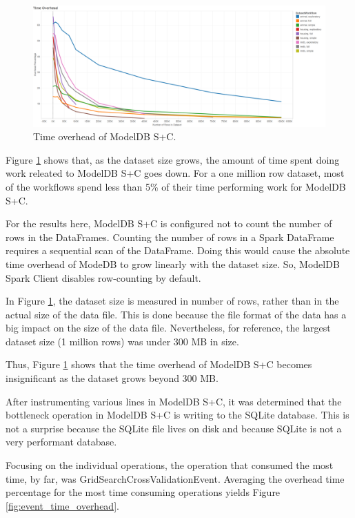 \begin{figure}
  \centering
  \includegraphics[width=6.0in]{time_overhead}
  \caption{
    Time overhead of ModelDB S+C.
  }
  \label{fig:time_overhead}
\end{figure}

Figure \ref{fig:time_overhead} shows that, as the dataset size grows, the amount of time
spent doing work releated to ModelDB S+C goes down. For a one million row dataset,
most of the workflows spend less than 5\% of their time performing work for ModelDB S+C.

For the results here, ModelDB S+C is configured not to count the number of rows in the DataFrames.
Counting the number of rows in a Spark DataFrame requires a sequential scan of the DataFrame. Doing this
would cause the absolute time overhead of ModeDB to grow linearly with the dataset size. So, ModelDB Spark
Client disables row-counting by default.

In Figure \ref{fig:time_overhead}, the dataset size is measured in number of rows, rather than in
the actual size of the data file. This is done because the file format of the data has a big impact on
the size of the data file. Nevertheless, for reference, the largest dataset size (1 million rows) was under 300 MB
in size.

Thus, Figure \ref{fig:time_overhead} shows that the time overhead of ModelDB S+C becomes insignificant 
as the dataset grows beyond 300 MB. 

After instrumenting various lines in ModelDB S+C, it was determined that the
bottleneck operation in ModelDB S+C is writing to the SQLite database. This is not a surprise
because the SQLite file lives on disk and because SQLite is not a very performant database.

Focusing on the individual operations, the operation that consumed the most time, by far, was
GridSearchCrossValidationEvent. Averaging the overhead time percentage for the most time
consuming operations yields Figure \ref{fig:event_time_overhead}.

